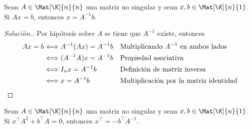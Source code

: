 \documentclass[compacto,10pt]{pubciencias-notas}
\begin{document}

\begin{ejem}\hspace{0pt} 
Sean $A\in\Mat[\K]{n}{n}$ una matriz no singular y sean $x, b \in \Mat[\K]{n}{1}$. Si $Ax = b$, entonces $x = A^{- 1}b$.

\begin{proof}[Solución.]\hspace{0pt} Por hipótesis sobre $A$ se tiene que $A^{-1}$ existe, entonces
\begin{align*}
    Ax = b
    &\Longleftrightarrow A^{-1}(Ax) = A^{-1}b
    && \text{Multiplicando $A^{- 1}$ en ambos lados}\\
    &\Longleftrightarrow (A^{-1}A)x = A^{-1}b
    && \text{Propiedad asociativa}\\
    &\Longleftrightarrow I_{n}x = A^{-1}b
    && \text{Definición de matriz inversa}\\
    &\Longleftrightarrow x = A^{-1}b
    && \text{Multiplicación por la matriz identidad}\qedhere
\end{align*}
\end{proof}
\end{ejem}

\begin{ejer}\hspace{0pt} 
Sean $A\in\Mat[\K]{n}{n}$ una matriz no singular y sean $x, b \in \Mat[\K]{n}{1}$. Si $x^{\intercal}A^{2} + b^{\intercal}A = 0$, entonces $x^{\intercal} = - b^{\intercal}A^{- 1}$.
\end{ejer}
\end{document}
